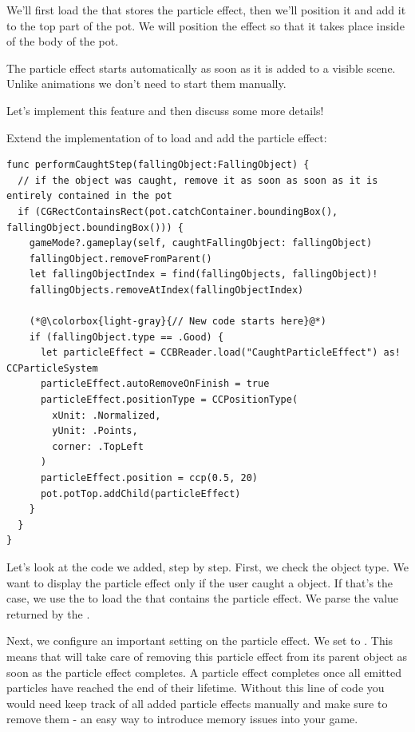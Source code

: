 We'll first load the \ccbfile{} that stores the particle effect, then we'll
position it and add it to the top part of the pot. We will position the effect
so that it takes place inside of the body of the pot. 

The particle effect starts
automatically as soon as it is added to a visible scene. Unlike animations we
don't need to start them manually.

Let's implement this feature and then discuss some more details!

\begin{leftbar}
Extend the implementation of  to
load and add the particle effect:
\begin{lstlisting}
func performCaughtStep(fallingObject:FallingObject) {
  // if the object was caught, remove it as soon as soon as it is entirely contained in the pot
  if (CGRectContainsRect(pot.catchContainer.boundingBox(), fallingObject.boundingBox())) {
    gameMode?.gameplay(self, caughtFallingObject: fallingObject)
    fallingObject.removeFromParent()
    let fallingObjectIndex = find(fallingObjects, fallingObject)!
    fallingObjects.removeAtIndex(fallingObjectIndex)
    
    (*@\colorbox{light-gray}{// New code starts here}@*)
    if (fallingObject.type == .Good) {
      let particleEffect = CCBReader.load("CaughtParticleEffect") as! CCParticleSystem
      particleEffect.autoRemoveOnFinish = true
      particleEffect.positionType = CCPositionType(
        xUnit: .Normalized,
        yUnit: .Points,
        corner: .TopLeft
      )
      particleEffect.position = ccp(0.5, 20)
      pot.potTop.addChild(particleEffect)
    }
  }
}
\end{lstlisting}
\end{leftbar}
Let's look at the code we added, step by step. First, we check the object type.
We want to display the particle effect only if the user caught a
 object. If that's the case, we use the 
to load the \ccbfile{} that contains the particle effect. We parse the value
returned by the .

Next, we configure an important setting on the particle effect. We set
 to . This means that \cocos{}
will take care of removing this particle effect from its parent object as soon
as the particle effect completes. A particle effect completes once all emitted
particles have reached the end of their lifetime. Without this line of code you
would need keep track of all added particle effects manually and make sure to
remove them - an easy way to introduce memory issues into your game.

